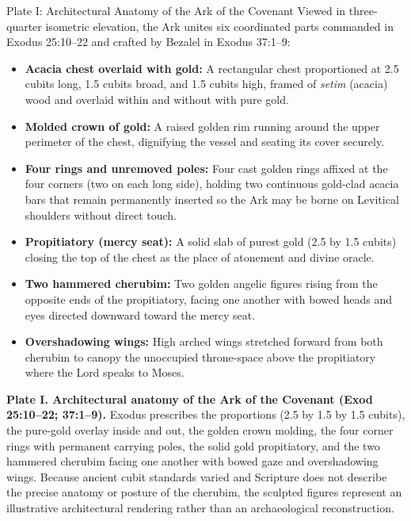 \begin{studybox}{Plate I: Architectural Anatomy of the Ark of the Covenant}
Viewed in three-quarter isometric elevation, the Ark unites six coordinated parts commanded in Exodus 25:10--22 and crafted by Bezalel in Exodus 37:1--9:
\begin{itemize}
  \item \textbf{Acacia chest overlaid with gold:} A rectangular chest proportioned at 2.5 cubits long, 1.5 cubits broad, and 1.5 cubits high, framed of \textit{setim} (acacia) wood and overlaid within and without with pure gold.
  \item \textbf{Molded crown of gold:} A raised golden rim running around the upper perimeter of the chest, dignifying the vessel and seating its cover securely.
  \item \textbf{Four rings and unremoved poles:} Four cast golden rings affixed at the four corners (two on each long side), holding two continuous gold-clad acacia bars that remain permanently inserted so the Ark may be borne on Levitical shoulders without direct touch.
  \item \textbf{Propitiatory (mercy seat):} A solid slab of purest gold (2.5 by 1.5 cubits) closing the top of the chest as the place of atonement and divine oracle.
  \item \textbf{Two hammered cherubim:} Two golden angelic figures rising from the opposite ends of the propitiatory, facing one another with bowed heads and eyes directed downward toward the mercy seat.
  \item \textbf{Overshadowing wings:} High arched wings stretched forward from both cherubim to canopy the unoccupied throne-space above the propitiatory where the Lord speaks to Moses.
\end{itemize}
\end{studybox}
\fi
\begin{platecaption}
\textbf{Plate I. Architectural anatomy of the Ark of the Covenant (Exod 25:10--22; 37:1--9).} Exodus prescribes the proportions (2.5 by 1.5 by 1.5 cubits), the pure-gold overlay inside and out, the golden crown molding, the four corner rings with permanent carrying poles, the solid gold propitiatory, and the two hammered cherubim facing one another with bowed gaze and overshadowing wings. Because ancient cubit standards varied and Scripture does not describe the precise anatomy or posture of the cherubim, the sculpted figures represent an illustrative architectural rendering rather than an archaeological reconstruction.
\end{platecaption}

